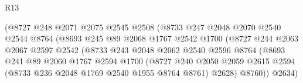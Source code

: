 \begin{lexlean}{R13}
\begin{coremodule}
                                      (@8727
                                        @248
                                        @2071
                                        @2075
                                        @2545
                                        @2508
                                        (@8733
                                          @247
                                          @2048
                                          @2070
                                          @2540
                                          @2544
                                          @8764
                                          (@8693
                                            @245
                                            @89
                                            @2068
                                            @1767
                                            @2542
                                            @1700
                                            (@8727
                                              @244
                                              @2063
                                              @2067
                                              @2597
                                              @2542
                                              (@8733
                                                @243
                                                @2048
                                                @2062
                                                @2540
                                                @2596
                                                @8764
                                                (@8693
                                                  @241
                                                  @89
                                                  @2060
                                                  @1767
                                                  @2594
                                                  @1700
                                                  (@8727
                                                    @240
                                                    @2050
                                                    @2059
                                                    @2615
                                                    @2594
                                                    (@8733 @236 @2048 @1769 @2540 @1955 @8764 @8761)
                                                    @2628)
                                                  @8760))
                                              @2634)

\end{coremodule}
\end{lexlean}
